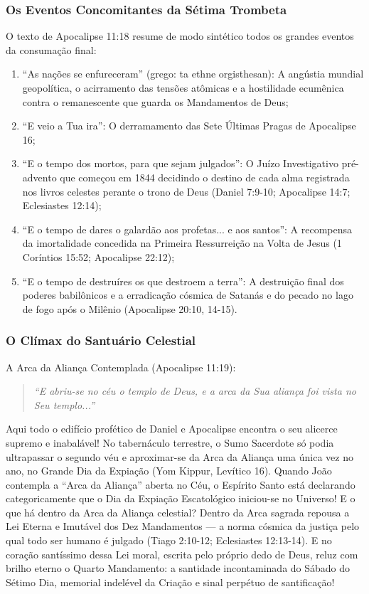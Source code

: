 \documentclass[11pt,a4paper,openany]{book}
\begin{document}
\subsubsection*{Os Eventos Concomitantes da Sétima Trombeta}
O texto de Apocalipse 11:18 resume de modo sintético todos os grandes eventos da consumação final:
\begin{enumerate}
  \item ``As nações se enfureceram'' (grego: ta ethne orgisthesan): A angústia mundial geopolítica, o acirramento das tensões atômicas e a hostilidade ecumênica contra o remanescente que guarda os Mandamentos de Deus;
  \item ``E veio a Tua ira'': O derramamento das Sete Últimas Pragas de Apocalipse 16;
  \item ``E o tempo dos mortos, para que sejam julgados'': O Juízo Investigativo pré-advento que começou em 1844 decidindo o destino de cada alma registrada nos livros celestes perante o trono de Deus (Daniel 7:9-10; Apocalipse 14:7; Eclesiastes 12:14);
  \item ``E o tempo de dares o galardão aos profetas... e aos santos'': A recompensa da imortalidade concedida na Primeira Ressurreição na Volta de Jesus (1 Coríntios 15:52; Apocalipse 22:12);
  \item ``E o tempo de destruíres os que destroem a terra'': A destruição final dos poderes babilônicos e a erradicação cósmica de Satanás e do pecado no lago de fogo após o Milênio (Apocalipse 20:10, 14-15).
\end{enumerate}



\subsubsection*{O Clímax do Santuário Celestial}
A Arca da Aliança Contemplada (Apocalipse 11:19):

\begin{quote}
\itshape ``E abriu-se no céu o templo de Deus, e a arca da Sua aliança foi vista no Seu templo...''
\end{quote}

Aqui todo o edifício profético de Daniel e Apocalipse encontra o seu alicerce supremo e inabalável!
No tabernáculo terrestre, o Sumo Sacerdote só podia ultrapassar o segundo véu e aproximar-se da Arca da Aliança uma única vez no ano, no Grande Dia da Expiação (Yom Kippur, Levítico 16).
Quando João contempla a ``Arca da Aliança'' aberta no Céu, o Espírito Santo está declarando categoricamente que o Dia da Expiação Escatológico iniciou-se no Universo!
E o que há dentro da Arca da Aliança celestial?
Dentro da Arca sagrada repousa a Lei Eterna e Imutável dos Dez Mandamentos — a norma cósmica da justiça pelo qual todo ser humano é julgado (Tiago 2:10-12; Eclesiastes 12:13-14). E no coração santíssimo dessa Lei moral, escrita pelo próprio dedo de Deus, reluz com brilho eterno o Quarto Mandamento: a santidade incontaminada do Sábado do Sétimo Dia, memorial indelével da Criação e sinal perpétuo de santificação!
\end{document}
